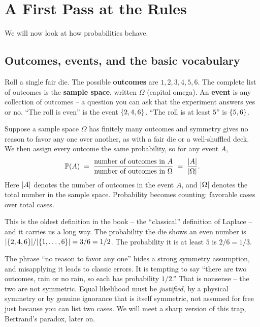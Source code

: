 \section{A First Pass at the Rules}
\label{ch01:rules}

We will now look at how probabilities behave.

\subsection{Outcomes, events, and the basic vocabulary}
\label{ch01:vocab}

Roll a single fair die. The possible \textbf{outcomes} are $1,2,3,4,5,6$. The
complete list of outcomes is the \textbf{sample space}, written $\Omega$ (capital
omega). An \textbf{event} is any collection of outcomes -- a question you can ask
that the experiment answers yes or no. ``The roll is even'' is the event
$\{2,4,6\}$. ``The roll is at least $5$'' is $\{5,6\}$.

\begin{definition}
\label{ch01:def-equally-likely}
Suppose a sample space $\Omega$ has finitely many outcomes and symmetry gives no
reason to favor any one over another, as with a fair die or a well-shuffled
deck. We then assign every outcome the same probability, so for any event $A$,
\[
  \operatorname{\mathbb{P}}(A) \;=\; \frac{\text{number of outcomes in } A}{\text{number of outcomes in } \Omega}
  \;=\; \frac{\lvert A\rvert}{\lvert\Omega\rvert}.
\]
Here $\lvert A\rvert$ denotes the number of outcomes in the event $A$, and
$\lvert\Omega\rvert$ denotes the total number in the sample space. Probability becomes
counting: favorable cases over total cases.
\end{definition}

This is the oldest definition in the book -- the ``classical'' definition of
Laplace -- and it carries us a long way. The probability the die shows an even
number is $\lvert\{2,4,6\}\rvert / \lvert\{1,\dots,6\}\rvert = 3/6 = 1/2$. The probability
it is at least $5$ is $2/6 = 1/3$.

\begin{trapbox}
The phrase ``no reason to favor any one'' hides a strong symmetry assumption, and misapplying it leads to classic errors. It is tempting to say ``there are two outcomes, rain or no rain, so each has
probability $1/2$.'' That is nonsense -- the two are not symmetric. Equal
likelihood must be \emph{justified}, by a physical symmetry or by genuine
ignorance that is itself symmetric, not assumed for free just because you can list
two cases. We will meet a sharp version of this trap, Bertrand's paradox, later on.
\end{trapbox}

